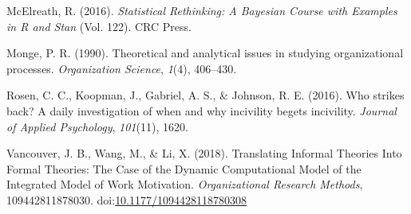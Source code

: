 \documentclass[english,,man]{apa6}
\theoremstyle{definition}
\theoremstyle{definition}
\theoremstyle{definition}
\theoremstyle{remark}
\begin{document}
\leavevmode\hypertarget{ref-mcelreath_statistical_2016}{}%
McElreath, R. (2016). \emph{Statistical Rethinking: A Bayesian Course
with Examples in R and Stan} (Vol. 122). CRC Press.

\leavevmode\hypertarget{ref-monge_theoretical_1990}{}%
Monge, P. R. (1990). Theoretical and analytical issues in studying
organizational processes. \emph{Organization Science}, \emph{1}(4),
406--430.

\leavevmode\hypertarget{ref-rosen_who_2016}{}%
Rosen, C. C., Koopman, J., Gabriel, A. S., \& Johnson, R. E. (2016). Who
strikes back? A daily investigation of when and why incivility begets
incivility. \emph{Journal of Applied Psychology}, \emph{101}(11), 1620.

\leavevmode\hypertarget{ref-vancouver_translating_2018}{}%
Vancouver, J. B., Wang, M., \& Li, X. (2018). Translating Informal
Theories Into Formal Theories: The Case of the Dynamic Computational
Model of the Integrated Model of Work Motivation. \emph{Organizational
Research Methods}, 109442811878030.
doi:\href{https://doi.org/10.1177/1094428118780308}{10.1177/1094428118780308}
\end{document}

